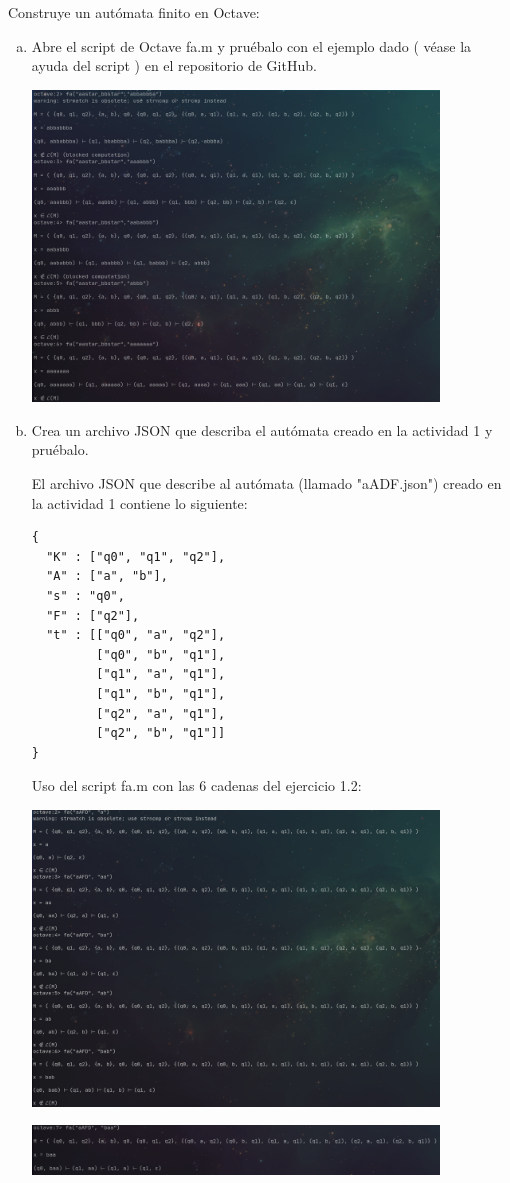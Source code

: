 Construye un autómata finito en Octave:

\begin{enumerate}[a)]
  \item Abre el script de Octave fa.m y pruébalo con el ejemplo dado ( véase la ayuda del script ) en el repositorio de GitHub.

    \includegraphics[width=0.85\textwidth]{images/octaveAutomataEjemplo.png}

  \item Crea un archivo JSON que describa el autómata creado en la actividad 1 y pruébalo.

    El archivo JSON que describe al autómata (llamado "aADF.json") creado en la actividad 1 contiene lo siguiente:

    \begin{verbatim}
{
  "K" : ["q0", "q1", "q2"],
  "A" : ["a", "b"],
  "s" : "q0",
  "F" : ["q2"],
  "t" : [["q0", "a", "q2"],
         ["q0", "b", "q1"],
         ["q1", "a", "q1"],
         ["q1", "b", "q1"],
         ["q2", "a", "q1"],
         ["q2", "b", "q1"]]
}
    \end{verbatim}

    \newpage

    Uso del script fa.m con las 6 cadenas del ejercicio 1.2:

    \includegraphics[width=0.85\textwidth]{images/automataOctaveA1.png}

    \includegraphics[width=0.85\textwidth]{images/automataOctaveA2.png}


\end{enumerate}

